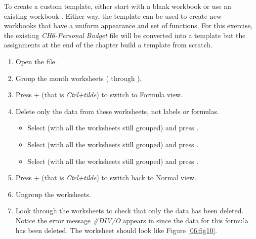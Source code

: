 To create a custom template, either start with a blank workbook or use an existing workbook . Either way, the template can be used to create new workbooks that have a uniform appearance and set of functions. For this exercise, the existing \textit{CH6-Personal Budget} file will be converted into a template but the assignments at the end of the chapter build a template from scratch.

\begin{enumbox}
	\begin{enumerate}
		\item Open the  file.
		\item Group the month worksheets ( through ).
		\item Press $+$\fmtKeystroke{$ \sim $} (that is \textit{Ctrl+tilde}) to switch to Formula view.
		\item Delete only the data from these worksheets, not labels or formulas. 
	
		\begin{itemize}
			\item Select  (with all the worksheets still grouped) and press .
			\item Select  (with all the worksheets still grouped) and press .
			\item Select  (with all the worksheets still grouped) and press .
		\end{itemize}	
	
	\item Press $+$\fmtKeystroke{$ \sim $} (that is \textit{Ctrl+tilde}) to switch back to Normal view.
		\item Ungroup the worksheets. 
		\item Look through the worksheets to check that only the data has been deleted. Notice the error message \textit{\#DIV/O} appears in  since the data for this formula has been deleted. The  worksheet should look like Figure \ref{06:fig10}.
	\end{enumerate}
\end{enumbox}
	
